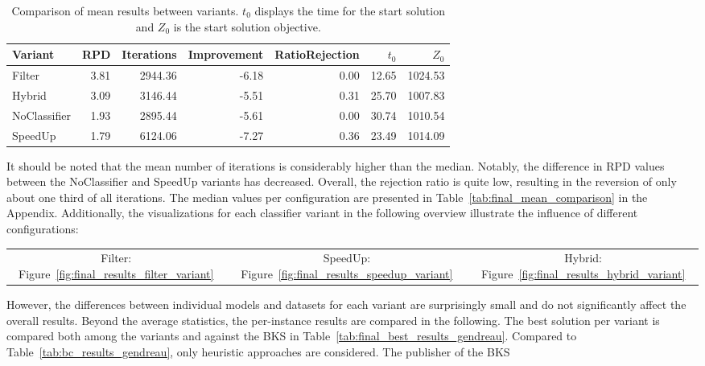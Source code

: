 \begin{table}
	\centering
	\small
	\begin{tabular}{lrrrrrr}
		\toprule
		Variant      & RPD  & Iterations & Improvement & RatioRejection & $t_0$ & $Z_0$   \\
		\midrule
		Filter       & 3.81 & 2944.36    & -6.18       & 0.00           & 12.65 & 1024.53 \\
		Hybrid       & 3.09 & 3146.44    & -5.51       & 0.31           & 25.70 & 1007.83 \\
		NoClassifier & 1.93 & 2895.44    & -5.61       & 0.00           & 30.74 & 1010.54 \\
		SpeedUp      & 1.79 & 6124.06    & -7.27       & 0.36           & 23.49 & 1014.09 \\
		\bottomrule
	\end{tabular}
	\caption[Comparison of mean results between variants.]{Comparison of mean results between variants. $t_0$ displays the time for the start solution and $Z_0$ is the start solution objective.}
	\label{tab:mean_final_results}
\end{table}
It should be noted that the mean number of iterations is considerably higher than the median. Notably, the difference in \gls{RPD}
values between the NoClassifier and SpeedUp variants has decreased. Overall, the rejection ratio is quite low, resulting in
the reversion of only about one third of all iterations. The median values per configuration are presented in
Table~\ref{tab:final_mean_comparison} in the Appendix. Additionally, the visualizations for each classifier variant in the following overview
illustrate the influence of different configurations:
\begin{table}[ht]
	\centering
	\setlength{\tabcolsep}{12pt}
	\begin{tabular}{ccc}
		Filter: Figure~\ref{fig:final_results_filter_variant} & SpeedUp: Figure~\ref{fig:final_results_speedup_variant} & Hybrid: Figure~\ref{fig:final_results_hybrid_variant}
	\end{tabular}
\end{table}
However, the differences between individual models and datasets for each variant are surprisingly small and do not significantly
affect the overall results. Beyond the average statistics, the per-instance results are compared in the following. The best solution
per variant is compared both among the variants and against the \gls{BKS} in Table~\ref{tab:final_best_results_gendreau}. Compared to Table~\ref{tab:bc_results_gendreau},
only heuristic approaches are considered. The publisher of the \gls{BKS}
